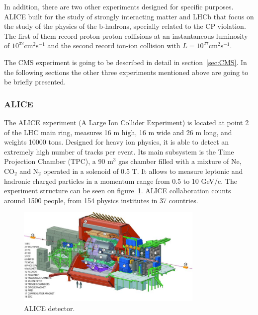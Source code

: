 In addition, there are two other experiments designed for specific purposes. ALICE built for the study of strongly interacting matter and LHCb that focus on the study of the physics of the b-hadrons, specially related to the CP violation. The first of them record proton-proton collisions at an instantaneous luminosity of $10^{32}\text{cm}^{2}\text{s}^{-1}$ and the second record ion-ion collision with $L = 10^{27}\text{cm}^{2}\text{s}^{-1}$.

The CMS experiment is going to be described in detail in section~\ref{sec:CMS}. In the following sections the other three experiments mentioned above are going to be briefly presented. 

\subsubsection{ALICE}
\label{sec:alice}

The ALICE experiment (A Large Ion Collider Experiment) is located at point 2 of the LHC main ring, measures 16 m high, 16 m wide and 26 m long, and weights 10000 tons. Designed for heavy ion physics, it is able to detect an extremely high number of tracks per event. Its main subsystem is the Time Projection Chamber (TPC), a 90 $\text{m}^{3}$ gas chamber filled with a mixture of Ne, $\text{CO}_{2}$ and $\text{N}_{2}$ operated in a solenoid of 0.5 T. It allows to measure leptonic and hadronic charged particles in a momentum range from 0.5 to 10 GeV/c. The experiment structure can be seen on figure~\ref{fig:alicedet}. ALICE collaboration counts around 1500 people, from 154 physics institutes in 37 countries.

\begin{figure}[!Hhtbp]
  \begin{center}
    \includegraphics[width=0.8\textwidth]{figs/alice2.jpg}
    \caption{ALICE detector.}
    \label{fig:alicedet}
  \end{center}
\end{figure}

